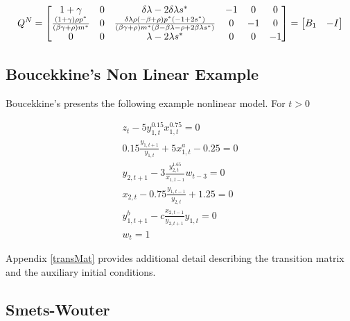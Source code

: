 \documentclass[12pt]{article}
\begin{document}
\begin{gather*}\label{eq:qn}
Q^N=
\begin{bmatrix}
1 + \gamma & 0&\delta  \lambda  - 2 \delta  \lambda  s^\ast&-1&0&0\\
  {{\left( 1 + \gamma  \right)  \rho  p^\ast}\over 
    {\left( \beta  \gamma  + \rho  \right)  m^\ast}}&0&
  {{\delta  \lambda  \rho  \left( -\beta  + \rho  \right)  p^\ast 
      \left( -1 + 2 s^\ast \right) }\over 
    {\left( \beta  \gamma  + \rho  \right)  m^\ast 
      \left( \beta  - \beta  \lambda  - \rho  + 2 \beta  \lambda  s^\ast \right)
      }}&0&-1&0\\
0&0&\lambda  - 2 \lambda  s^\ast&0&0&-1 
\end{bmatrix} =
\begin{bmatrix}
  B_1&-I
\end{bmatrix}
\end{gather*}

\subsection{Boucekkine's Non Linear Example}
Boucekkine's\cite{BOUCEKKINE:95} presents the following
example nonlinear model. For $t>0$


  \begin{gather*}
z_t - 5 y_{1,t}^{0.15} x_{1,t}^{0.75} =0\\
0.15 \frac{y_{1,t+1}}{y_{1,t}} + 5 x_{1,t}^a - 0.25 = 0\\
y_{2,t+1} - 3 \frac{y_{2,t}^{1.65}}{x_{1,t-1}} w_{t-3}=0\\
x_{2,t} - 0.75 \frac{y_{1,t-1}}{y_{2,t}} + 1.25 = 0\\
y_{1,t+1}^b - c \frac{x_{2,t-1}}{y_{2,t+1}} y_{1,t}=0\\
w_{t} = 1
  \end{gather*}



%



%

Appendix \ref{transMat} provides additional detail describing the
transition matrix and the auxiliary initial conditions.

%

\subsection{Smets-Wouter}
\label{sec:edo}
\end{document}
